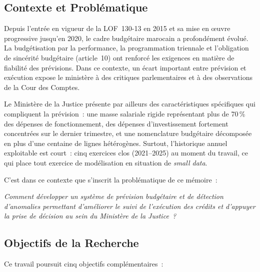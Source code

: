 \documentclass[12pt,a4paper]{article}
\begin{document}
\subsection*{Contexte et Probl\'ematique}

Depuis l'entr\'ee en vigueur de la LOF~130-13 en 2015 et sa mise en \oe{}uvre progressive jusqu'en 2020, le cadre budg\'etaire marocain a profond\'ement \'evolu\'e. La budg\'etisation par la performance, la programmation triennale et l'obligation de sinc\'erit\'e budg\'etaire (article~10) ont renforc\'e les exigences en mati\`ere de fiabilit\'e des pr\'evisions. Dans ce contexte, un \'ecart important entre pr\'evision et ex\'ecution expose le minist\`ere \`a des critiques parlementaires et \`a des observations de la Cour des Comptes.

Le Minist\`ere de la Justice pr\'esente par ailleurs des caract\'eristiques sp\'ecifiques qui compliquent la pr\'evision~: une masse salariale rigide repr\'esentant plus de 70\,\% des d\'epenses de fonctionnement, des d\'epenses d'investissement fortement concentr\'ees sur le dernier trimestre, et une nomenclature budg\'etaire d\'ecompos\'ee en plus d'une centaine de lignes h\'et\'erog\`enes. Surtout, l'historique annuel exploitable est court~: cinq exercices clos (2021--2025) au moment du travail, ce qui place tout exercice de mod\'elisation en situation de \textit{small data}.

C'est dans ce contexte que s'inscrit la probl\'ematique de ce m\'emoire~:

\begin{center}
\textit{Comment d\'evelopper un syst\`eme de pr\'evision budg\'etaire et de d\'etection d'anomalies permettant d'am\'eliorer le suivi de l'ex\'ecution des cr\'edits et d'appuyer la prise de d\'ecision au sein du Minist\`ere de la Justice~?}
\end{center}

\subsection*{Objectifs de la Recherche}

Ce travail poursuit cinq objectifs compl\'ementaires~:
\end{document}
